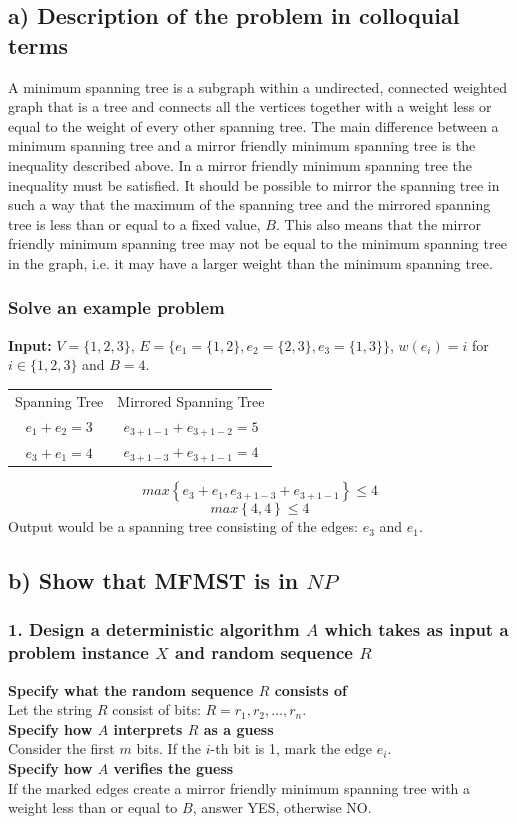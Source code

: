\documentclass[12pt]{article}
\begin{document}
\subsection*{a) Description of the problem in colloquial terms}
A minimum spanning tree is a subgraph within a undirected, connected weighted graph that is a tree and connects all the vertices together with a weight less or equal to the weight of every other spanning tree. The main difference between a minimum spanning tree and a mirror friendly minimum spanning tree is the inequality described above. In a mirror friendly minimum spanning tree the inequality must be satisfied. It should be possible to mirror the spanning tree in such a way that the maximum of the spanning tree and the mirrored spanning tree is less than or equal to a fixed value, $B$. This also means that the mirror friendly minimum spanning tree may not be equal to the minimum spanning tree in the graph, i.e. it may have a larger weight than the minimum spanning tree.

\subsubsection*{Solve an example problem}
\textbf{Input:} $V = \{1,2,3\}$, $E = \{e_1 = \{1,2\},e_2 = \{2,3\},e_3 = \{1,3\}\}$, $w(e_i) = i$ for $i \in \{1,2,3\}$ and $B = 4$.
\begin{center}
\begin{tabular}{ c c }
Spanning Tree & Mirrored Spanning Tree\\
$e_1 + e_2 = 3$ & $e_{3+1-1} + e_{3+1-2} = 5$\\
$e_3 + e_1 = 4$ & $e_{3+1-3} + e_{3+1-1} = 4$\\
\end{tabular}
\end{center}
$$max \left\{e_3 + e_1, e_{3+1-3} + e_{3+1-1}\right\} \leq 4$$
$$max \left\{4, 4\right\} \leq 4$$
Output would be a spanning tree consisting of the edges: $e_3$ and $e_1$.
\subsection*{b) Show that MFMST is in $NP$}
\subsubsection*{1. Design a deterministic algorithm $A$ which takes as input a problem instance $X$ and random sequence $R$}
\textbf{Specify what the random sequence $R$ consists of}\\
Let the string $R$ consist of bits: $R = r_1,r_2,\dots,r_n$.\\[0.25cm]
\textbf{Specify how $A$ interprets $R$ as a guess}\\
Consider the first $m$ bits. If the $i$-th bit is 1, mark the edge $e_i$.\\[0.25cm]
\textbf{Specify how $A$ verifies the guess}\\
If the marked edges create a mirror friendly minimum spanning tree with a weight less than or equal to $B$, answer YES, otherwise NO.
\end{document}
